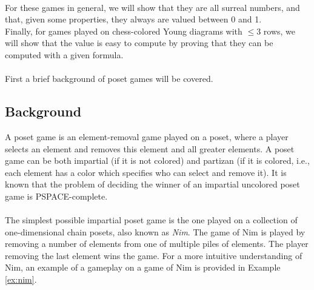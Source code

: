 ~\\
For these games in general, we will show that they are all surreal numbers, and that, given some properties, they always are valued between 0 and 1. %
\\
Finally, for games played on chess-colored Young diagrams with $\le3$ rows, we will show that the value is easy to compute by proving that they can be computed with a given formula.
\\\\
First a brief background of poset games will be covered.
\subsection{Background}
A poset game is an element-removal game played on a poset, where a player selects an element and removes this element and all greater elements. A poset game can be both impartial (if it is not colored) and partizan (if it is colored, i.e., each element has a color which specifies who can select and remove it). It is known that the problem of deciding the winner of an impartial uncolored poset game is \textsf{PSPACE}-complete\cite{grier2013}.
\\\\
The simplest possible impartial poset game is the one played on a collection of one-dimensional chain posets, also known as \emph{Nim}. The game of Nim is played by removing a number of elements from one of multiple piles of elements. The player removing the last element wins the game. For a more intuitive understanding of Nim, an example of a gameplay on a game of Nim is provided in Example \ref{ex:nim}.
